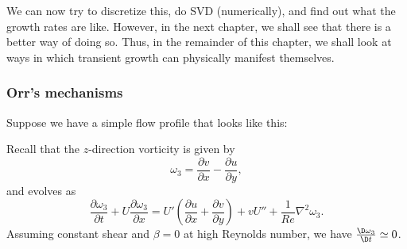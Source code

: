 \documentclass[a4paper]{article}
\begin{document}
We can now try to discretize this, do SVD (numerically), and find out what the growth rates are like. However, in the next chapter, we shall see that there is a better way of doing so. Thus, in the remainder of this chapter, we shall look at ways in which transient growth can physically manifest themselves.

\subsubsection*{Orr's mechanisms}
Suppose we have a simple flow profile that looks like this:
\begin{center}
\end{center}
Recall that the $z$-direction vorticity is given by
\[
  \omega_3 = \frac{\partial v}{\partial x} - \frac{\partial u}{\partial y},
\]
and evolves as
\[
  \frac{\partial \omega_3}{\partial t} + U \frac{\partial \omega_3}{\partial x} = U' \left(\frac{\partial u}{\partial x} + \frac{\partial v}{\partial y}\right) + v U'' + \frac{1}{Re} \nabla^2 \omega_3.
\]
Assuming constant shear and $\beta = 0$ at high Reynolds number, we have $\frac{\D \omega_3}{\D t} \simeq 0$.
\end{document}
